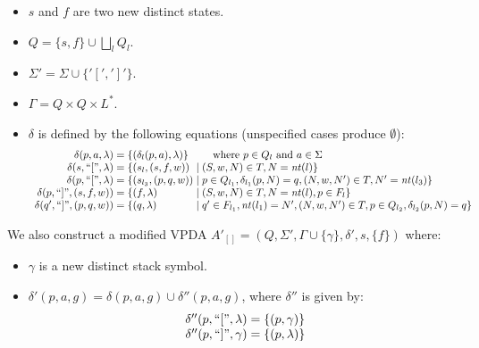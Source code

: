 \documentclass[runningheads]{llncs}
\newcommand{\T}{\Sigma} %
\newcommand{\Labels}{L} %
\newcommand{\pospl}{[}
\newcommand{\pospr}{]}
\newcommand{\posp}[1]{\pospl#1\pospr}
\newcommand{\labelnt}{\mathit{nt}} %
\begin{document}
\begin{itemize}
\item $s$ and $f$ are two new distinct states.
\item $Q = \{s, f\} \cup \bigsqcup_l Q_l$.
\item $\T' = \T \cup \{'\pospl', '\pospr'\}$.
\item $\Gamma = Q \times Q \times \Labels^{*}$.
\item $\delta$ is defined by the following equations (unspecified cases produce $\emptyset$):
  $$
  \begin{array}{r@{\;=\;}l@{\;\mid\;}l}
    \delta(p, a, \lambda)
    & \multicolumn{2}{@{}l@{}}{\{(\delta_l(p, a), \lambda)\} \qquad \text{ where } p \in Q_l \text{ and } a \in \T} \\

    \delta(s, \text{``}\pospl\text{''}, \lambda)
    & \{ (s_{l}, (s, f, w))
    & (S, w, N) \in T, N = \labelnt(l) \} \\

    \delta(p, \text{``}\pospl\text{''}, \lambda)
    & \{ (s_{l_3}, (p, q, w))
    & p \in Q_{l_1}, \delta_{l_1}(p, N) = q, (N, w, N') \in T, N' = \labelnt(l_3) \} \\

    \delta(p, \text{``}\pospr\text{''}, (s, f, w))
    & \{ (f, \lambda)
    & (S, w, N) \in T, N = \labelnt(l), p \in F_l \} \\

    \delta(q', \text{``}\pospr\text{''}, (p, q, w))
    & \{ (q, \lambda)
    & q' \in F_{l_1}, \labelnt(l_1) = N', (N, w, N') \in T, p \in Q_{l_2}, \delta_{l_2}(p, N) = q \} \\

  \end{array}
  $$
\end{itemize}

\noindent We also construct a modified VPDA $A'_{\posp{}} = (Q, \T', \Gamma \cup \{\gamma\}, \delta', s, \{f\})$ where:

\begin{itemize}
\item $\gamma$ is a new distinct stack symbol.
\item $\delta'(p, a, g) = \delta(p, a, g) \cup \delta''(p, a, g)$, where $\delta''$ is given by:
  $$
  \begin{array}{r@{\;=\;}l@{}}
    \delta''(p, \text{``}\pospl\text{''}, \lambda)
    & \{ (p, \gamma) \} \\

    \delta''(p, \text{``}\pospr\text{''}, \gamma)
    & \{ (p, \lambda) \} \\
  \end{array}
  $$
\end{itemize}
\end{document}
